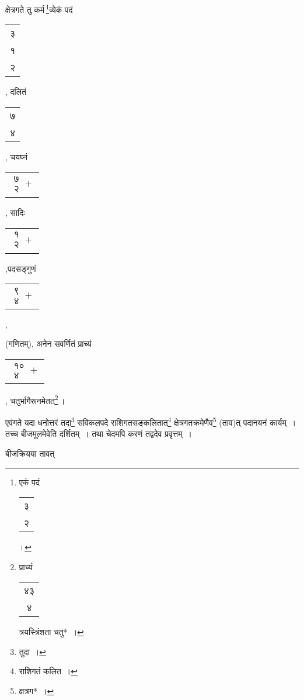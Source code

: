 \documentclass[10pt, openany]{book}
\begin{document}
{{{{{{{{{{{क्षेत्रगते तु कर्म\textendash \,\renewcommand{\thefootnote}{६}\footnote{एकं पदं\begin{tabular}{c}३\\ २\end{tabular}।}व्येकं पदं\begin{tabular}{c}३ \\१\\ २\end{tabular}, दलितं\begin{tabular}{c}७\\ ४\end{tabular}, चयघ्नं\begin{tabular}{c}$\begin{matrix}
\mbox{{७}}\\
\mbox{{२}}
\end{matrix}+$\end{tabular},
सादिः\begin{tabular}{c}$\begin{matrix}
\mbox{{१}}\\
\mbox{{२}}
\end{matrix}+$\end{tabular},पदसङ्गुणं\begin{tabular}{c}$\begin{matrix}
\mbox{{९}}\\
\mbox{{४}}
\end{matrix}+$\end{tabular}, {(गणितम्), अनेन सवर्णितं प्राच्यं\begin{tabular}{c}$\begin{matrix}
\mbox{{१०}}\\
\mbox{{४}}
\end{matrix}+$\end{tabular}, चतुर्भागैरूनमेतत्\renewcommand{\thefootnote}{७}\footnote{प्राच्यं\begin{tabular}{c}४३\\ ४\end{tabular}त्रयस्त्रिंशता चतु*~।}\,।}
\vspace{3mm}

{एवंगते यदा धनोत्तरं तदा\renewcommand{\thefootnote}{८}\footnote{तुदा~।} सविकलपदे राशिगतसङ्कलितात्\renewcommand{\thefootnote}{९}\footnote{राशिगतं कलित~।}
क्षेत्रगतक्रमेणैव\renewcommand{\thefootnote}{१०}\footnote{क्षत्रग*~।} (ताव)त् पदानयनं कार्यम्~। तच्च बीजमूलमेवेति दर्शितम्~। तथा चेदमपि करणं
तद्वदेव प्रवृत्तम्~।}
\vspace{3mm}

{बीजक्रियया तावत्\textendash}
\vspace{2mm}

}}}}}}}}}}}
\end{document}

